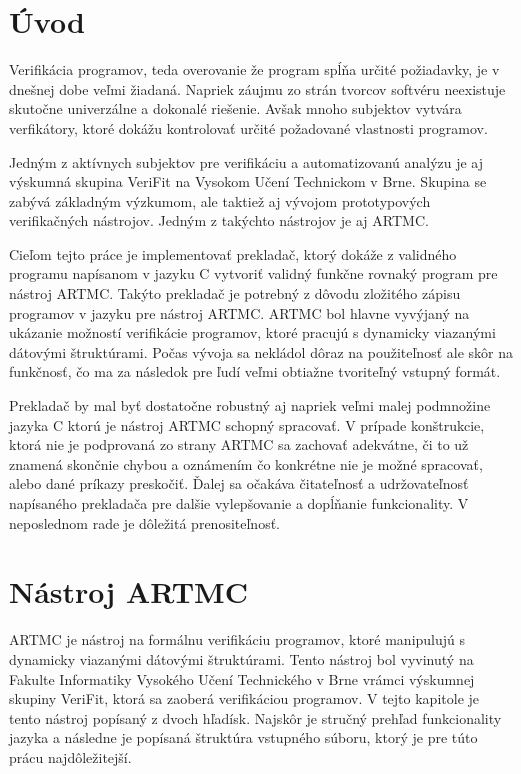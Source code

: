 
\chapter{Úvod}
Verifikácia programov, teda overovanie že program spĺňa určité požiadavky, je v dnešnej dobe veľmi žiadaná. Napriek záujmu zo strán tvorcov softvéru neexistuje skutočne univerzálne a dokonalé riešenie. Avšak mnoho subjektov vytvára verfikátory, ktoré dokážu kontrolovať určité požadované vlastnosti programov.

Jedným z aktívnych subjektov pre verifikáciu a automatizovanú analýzu je aj výskumná skupina VeriFit na Vysokom Učení Technickom v Brne. Skupina se zabývá základným výzkumom, ale taktiež aj vývojom prototypových verifikačných nástrojov. Jedným z takýchto nástrojov je aj ARTMC.

Cieľom tejto práce je implementovať prekladač, ktorý dokáže z validného programu napísanom v jazyku C vytvoriť validný funkčne rovnaký program pre nástroj ARTMC. Takýto prekladač je potrebný z dôvodu zložitého zápisu programov v jazyku pre nástroj ARTMC. ARTMC bol hlavne vyvýjaný na ukázanie možností verifikácie programov, ktoré pracujú s dynamicky viazanými dátovými štruktúrami. Počas vývoja sa nekládol dôraz na použiteľnosť ale skôr na funkčnosť, čo ma za následok pre ľudí veľmi obtiažne tvoriteľný vstupný formát.

Prekladač by mal byť dostatočne robustný aj napriek veľmi malej podmnožine jazyka C ktorú je nástroj ARTMC schopný spracovať. V prípade konštrukcie, ktorá nie je podprovaná zo strany ARTMC sa zachovať adekvátne, či to už znamená skončnie chybou a oznámením čo konkrétne nie je možné spracovať, alebo dané príkazy preskočiť. Ďalej sa očakáva čitateľnosť a udržovateľnosť napísaného prekladača pre dalšie vylepšovanie a dopĺňanie funkcionality. V neposlednom rade je dôležitá prenositeľnosť.


\chapter{Nástroj ARTMC}
\label{kap_artmc}
ARTMC je nástroj na formálnu verifikáciu programov, ktoré manipulujú s
dynamicky viazanými dátovými štruktúrami. Tento nástroj bol vyvinutý na Fakulte
Informatiky Vysokého Učení Technického v Brne vrámci výskumnej skupiny VeriFit,
ktorá sa zaoberá verifikáciou programov. V tejto kapitole je tento nástroj
popísaný z dvoch hľadísk. Najskôr je stručný prehľad funkcionality jazyka a
následne je popísaná štruktúra vstupného súboru, ktorý je pre túto prácu
najdôležitejší.


